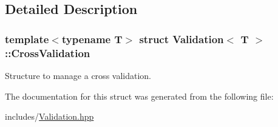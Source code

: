 \subsection{Detailed Description}
\subsubsection*{template$<$typename T$>$\newline
struct Validation$<$ T $>$\+::\+Cross\+Validation}

Structure to manage a cross validation. 

The documentation for this struct was generated from the following file\+:\begin{DoxyCompactItemize}
\item 
includes/\mbox{\hyperlink{_validation_8hpp}{Validation.\+hpp}}\end{DoxyCompactItemize}
